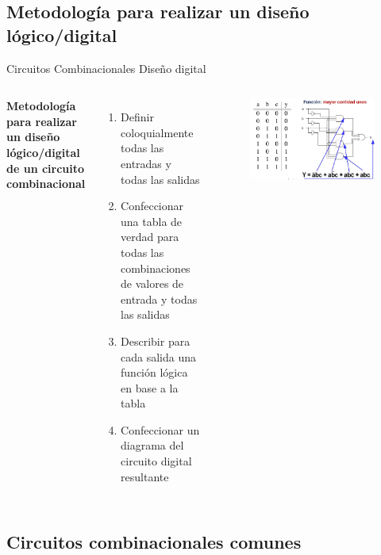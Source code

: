 \documentclass[aspectratio=169,compress]{beamer}
\begin{document}
\begin{footnotesize}
\subsection{Metodología para realizar un diseño lógico/digital}

\begin{frame} {Circuitos Combinacionales} {Diseño digital}

 \begin{columns}[onlytextwidth,T]
      \column{\dimexpr\linewidth-60mm-5mm}
\textbf{Metodología para realizar un diseño lógico/digital de un circuito combinacional}
\bigskip
\begin{enumerate}
\item Definir coloquialmente todas las entradas y todas las salidas
\item Confeccionar una tabla de verdad para todas las combinaciones de valores de entrada y todas las salidas
\item Describir para cada salida una función lógica en base a la tabla
\item Confeccionar un diagrama del circuito digital resultante
\end{enumerate}

	\column{60mm}

\begin{figure}
\includegraphics[scale=0.18]{images/construcciondigital.jpg} 
\end{figure}
  \end{columns}
\end{frame}


\subsection{Circuitos combinacionales comunes}



\end{footnotesize}
\end{document}
